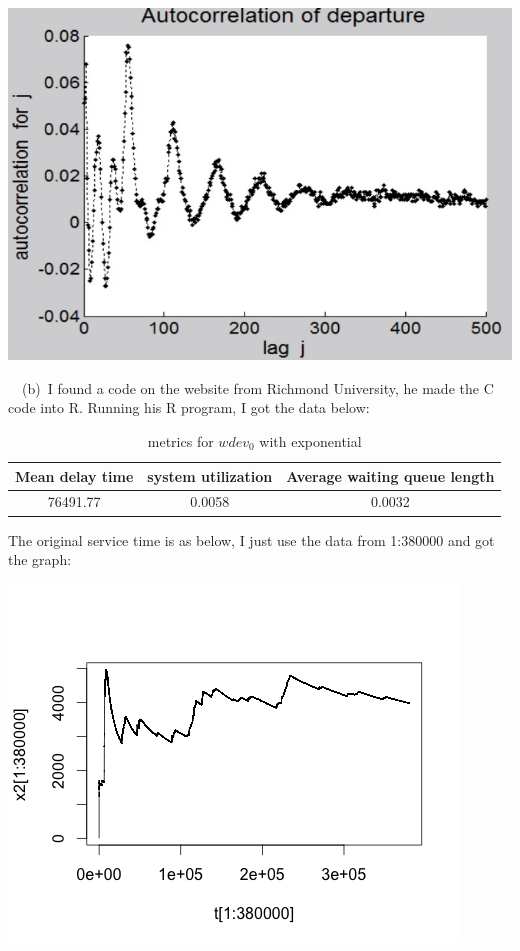 \documentclass[11pt]{article}
\begin{document}
\begin{center}
\includegraphics[scale=0.3]{C2_2000.png}
\end{center} 
~~(b)~I found a code on the website from Richmond University, he made the C code into R. Running his R program, I got the data below: \\
\begin{table}[htdp]
\caption{metrics for $wdev_0$ with exponential}
\begin{center}
\begin{tabular}{c|c|c}
Mean delay time & system utilization & Average waiting queue length \\
\hline
76491.77 & 0.0058 & 0.0032
\end{tabular}
\end{center}
\label{default}
\end{table}%
The original service time is as below, I just use the data from 1:380000 and got the graph: \\
\begin{center}
\includegraphics[scale=0.5]{mean2.png}
\end{center}
\end{document}

